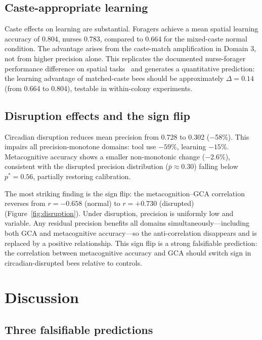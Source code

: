 \documentclass[12pt]{article}
\newcommand{\pstar}{p^*}
\begin{document}
\subsection*{Caste-appropriate learning}

Caste effects on learning are substantial. Foragers achieve a mean spatial learning accuracy of
0.804, nurses 0.783, compared to 0.664 for the mixed-caste normal condition. The advantage arises
from the caste-match amplification in Domain 3, not from higher precision alone. This replicates
the documented nurse-forager performance difference on spatial tasks~\cite{SciAdv2024Caste} and
generates a quantitative prediction: the learning advantage of matched-caste bees should be
approximately $\Delta = 0.14$ (from 0.664 to 0.804), testable in within-colony experiments.

\subsection*{Disruption effects and the sign flip}

Circadian disruption reduces mean precision from 0.728 to 0.302 ($-$58\%). This impairs all
precision-monotone domains: tool use $-59\%$, learning $-15\%$. Metacognitive accuracy shows a
smaller non-monotonic change ($-$2.6\%), consistent with the disrupted precision distribution
($\bar{p} \approx 0.30$) falling below $\pstar = 0.56$, partially restoring calibration.

The most striking finding is the sign flip: the metacognition--GCA correlation reverses from
$r = -0.658$ (normal) to $r = +0.730$ (disrupted) (Figure~\ref{fig:disruption}). Under
disruption, precision is uniformly low and variable. Any residual precision benefits all
domains simultaneously---including both GCA and metacognitive accuracy---so the anti-correlation
disappears and is replaced by a positive relationship. This sign flip is a strong falsifiable
prediction: the correlation between metacognitive accuracy and GCA should switch sign in
circadian-disrupted bees relative to controls.

\section{Discussion}
\label{sec:discussion}

\subsection*{Three falsifiable predictions}
\end{document}
